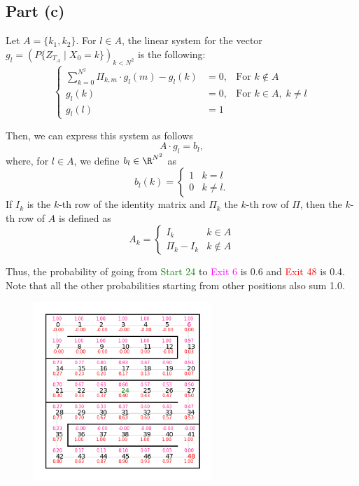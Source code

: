 \subsection*{Part (c)}

Let $A = \{k_1,k_2\}$. For $l\in A$, the linear system for the vector $g_l = {(P\{Z_{T_A}\;|\; X_0 = k\})}_{k<N^2}$ is the following:
\[ \left\{\begin{array}{ccl}
    \sum_{k = 0}^{N^2} \Pi_{k,m} \cdot g_l(m) - g_l(k) & = 0, & \mbox{For }k \not\in A\\
    g_l(k) & = 0, & \mbox{For }k \in A,\; k\neq l\\
    g_l(l) & = 1
\end{array}\right. \]

Then, we can express this system as follows
\[ A \cdot g_l = b_l, \]
where, for $l\in A$, we define $b_l \in \R^{N^2}$ as 
\[ b_l(k) = \begin{cases}
    1 & k = l\\
    0 & k\neq l.
\end{cases} \]
If $I_k$ is the $k$-th row of the identity matrix and $\Pi_k$ the $k$-th row of $\Pi$, then the $k$-th row of $A$ is defined as
\[ A_{k} = \begin{cases}
    I_k & k\in A\\
    \Pi_{k}-I_k & k\not\in A
\end{cases}\]

Thus, the probability of going from \textcolor{Green}{Start 24} to \textcolor{magenta}{Exit 6} is 0.6 and \textcolor{red}{Exit 48} is 0.4. Note that all the other probabilities starting from other positions also sum 1.0.

\begin{figure}[H]
    \centering
    \includegraphics[width=0.6\textwidth]{../pictures/216-3.png}
\end{figure}

